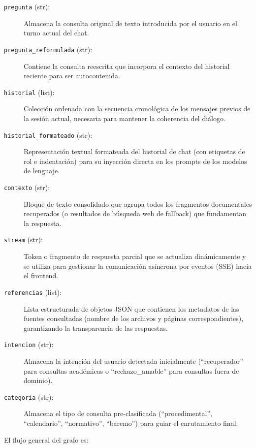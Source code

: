 \documentclass[12pt,a4paper,oneside]{report}
\begin{document}
\begin{description}
    \item[\texttt{pregunta} (str):] Almacena la consulta original de texto introducida por el usuario en el turno actual del chat.
    \item[\texttt{pregunta\_reformulada} (str):] Contiene la consulta reescrita que incorpora el contexto del historial reciente para ser autocontenida.
    \item[\texttt{historial} (list):] Colección ordenada con la secuencia cronológica de los mensajes previos de la sesión actual, necesaria para mantener la coherencia del diálogo.
    \item[\texttt{historial\_formateado} (str):] Representación textual formateada del historial de chat (con etiquetas de rol e indentación) para su inyección directa en los prompts de los modelos de lenguaje.
    \item[\texttt{contexto} (str):] Bloque de texto consolidado que agrupa todos los fragmentos documentales recuperados (o resultados de búsqueda web de fallback) que fundamentan la respuesta.
    \item[\texttt{stream} (str):] Token o fragmento de respuesta parcial que se actualiza dinámicamente y se utiliza para gestionar la comunicación asíncrona por eventos (SSE) hacia el frontend.
    \item[\texttt{referencias} (list):] Lista estructurada de objetos JSON que contienen los metadatos de las fuentes consultadas (nombre de los archivos y páginas correspondientes), garantizando la transparencia de las respuestas.
    \item[\texttt{intencion} (str):] Almacena la intención del usuario detectada inicialmente (``recuperador'' para consultas académicas o ``rechazo\_amable'' para consultas fuera de dominio).
    \item[\texttt{categoria} (str):] Almacena el tipo de consulta pre-clasificada (``procedimental'', ``calendario'', ``normativo'', ``baremo'') para guiar el enrutamiento final.
\end{description}

El flujo general del grafo es:
\end{document}
